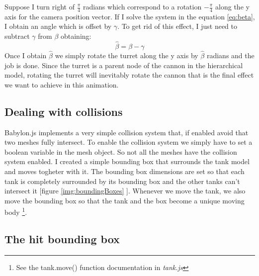 \documentclass[14pt]{article}
\begin{document}
Suppose I turn right of \(\frac{\pi}{4}\) radians which correspond to a rotation \(-\frac{\pi}{4}\) along the y axis for the camera position vector. If I solve the system  in the equation \ref{eq:beta}, I obtain an angle which is offset by \(\gamma\). To get rid of this effect, I just need to subtract \(\gamma\) from  \(\beta\) obtaining:
\[\hat{\beta} = \beta - \gamma\]
Once I obtain \(\hat{\beta}\) we simply rotate the turret along the y axis by \(\hat{\beta}\) radians and the job is done. Since the turret is a parent node of the cannon in the hierarchical model, rotating the turret will inevitably rotate the cannon that is the final effect we want to achieve in this animation. 
\subsection{Dealing with collisions}
Babylon.js implements a very simple collision system that, if enabled avoid that two meshes fully intersect. To enable the collision system we simply have to set a boolean variable in the mesh object. So not all the meshes have the collision system enabled. I created a simple bounding box that surrounds the tank model and moves togheter with it. The bounding box dimensions are set so that each tank is completely surrounded by its bounding box and the other tanks can't intersect it [figure \ref{img:boundingBoxes} ]. Whenever we move the tank, we also move the bounding box so that the tank and the box become a unique moving body \footnote{See the tank.move() function documentation in \textit{tank.js}}.

\subsection{The hit bounding box}
\end{document}
